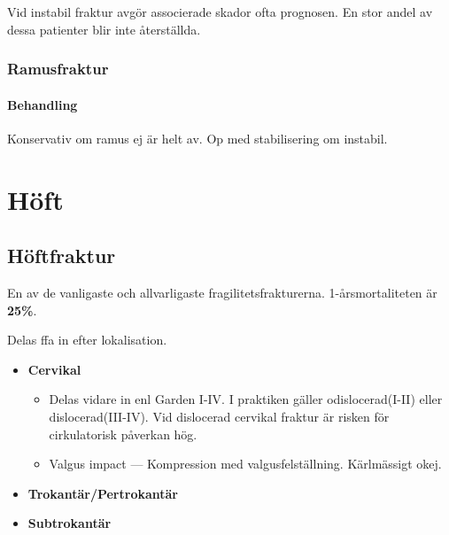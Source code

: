 \documentclass[
  letterpaper,
  DIV=11,
  numbers=noendperiod]{scrreport}
\let\oldparagraph\paragraph
\renewcommand{\paragraph}[1]{\oldparagraph{#1}\mbox{}}
\providecommand{\tightlist}{%
  \setlength{\itemsep}{0pt}\setlength{\parskip}{0pt}}\usepackage{longtable,booktabs,array}
\begin{document}
Vid instabil fraktur avgör associerade skador ofta prognosen. En stor
andel av dessa patienter blir inte återställda.

\hypertarget{ramusfraktur}{%
\subsubsection{Ramusfraktur}\label{ramusfraktur}}

\hypertarget{behandling-11}{%
\paragraph{Behandling}\label{behandling-11}}

Konservativ om ramus ej är helt av. Op med stabilisering om instabil.

\hypertarget{huxf6ft}{%
\section{Höft}\label{huxf6ft}}

\hypertarget{huxf6ftfraktur}{%
\subsection{Höftfraktur}\label{huxf6ftfraktur}}

En av de vanligaste och allvarligaste fragilitetsfrakturerna.
1-årsmortaliteten är \textbf{25\%}.

\begin{tcolorbox}[enhanced jigsaw, colback=white, colbacktitle=quarto-callout-tip-color!10!white, toptitle=1mm, arc=.35mm, toprule=.15mm, rightrule=.15mm, titlerule=0mm, breakable, bottomrule=.15mm, colframe=quarto-callout-tip-color-frame, left=2mm, opacityback=0, coltitle=black, title=\textcolor{quarto-callout-tip-color}{\faLightbulb}\hspace{0.5em}{Klassifikation}, leftrule=.75mm, bottomtitle=1mm, opacitybacktitle=0.6]

Delas ffa in efter lokalisation.

\begin{itemize}
\tightlist
\item
  \textbf{Cervikal}

  \begin{itemize}
  \tightlist
  \item
    Delas vidare in enl Garden I-IV. I praktiken gäller
    odislocerad(I-II) eller dislocerad(III-IV). Vid dislocerad cervikal
    fraktur är risken för cirkulatorisk påverkan hög.
  \item
    Valgus impact --- Kompression med valgusfelställning. Kärlmässigt
    okej.
  \end{itemize}
\item
  \textbf{Trokantär/Pertrokantär}
\item
  \textbf{Subtrokantär}
\end{itemize}

\end{tcolorbox}
\end{document}

